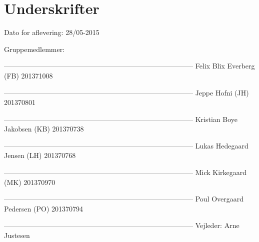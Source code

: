 \chapter*{Underskrifter}

Dato for aflevering: 28/05-2015

Gruppemedlemmer: \newline


--------------------------------------------------------------------------------- \newline
Felix Blix Everberg (FB) 201371008\newline



--------------------------------------------------------------------------------- \newline
Jeppe Hofni (JH) 201370801\newline



--------------------------------------------------------------------------------- \newline
Kristian Boye Jakobsen (KB) 201370738\newline



--------------------------------------------------------------------------------- \newline
Lukas Hedegaard Jensen (LH) 201370768\newline



--------------------------------------------------------------------------------- \newline
Mick Kirkegaard (MK) 201370970\newline



--------------------------------------------------------------------------------- \newline
Poul Overgaard Pedersen (PO) 201370794\newline













--------------------------------------------------------------------------------- \newline
Vejleder: Arne Justesen \newline

\afterpage{\null\newpage}
